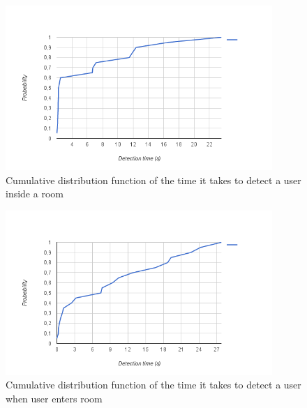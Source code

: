 \begin{figure}[]
\centering
\includegraphics[width=0.9\textwidth]{Figures/room_detection_cumulative}
\caption{Cumulative distribution function of the time it takes to detect a user inside a room}
\label{eval:room}
\end{figure}

\begin{figure}[]
\centering
\includegraphics[width=0.9\textwidth]{Figures/room_detection_cumulative2}
\caption{Cumulative distribution function of the time it takes to detect a user when user enters room}
\label{eval:room2}
\end{figure}

